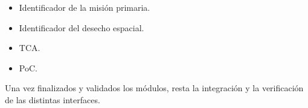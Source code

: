 \begin{itemize}
\item Identificador de la  misi\'on primaria.
\item Identificador del desecho espacial.
\item TCA.
\item PoC.
\end{itemize}  

Una vez finalizados y validados los m\'odulos, resta la integraci\'on y la verificaci\'on de las distintas interfaces.\\






